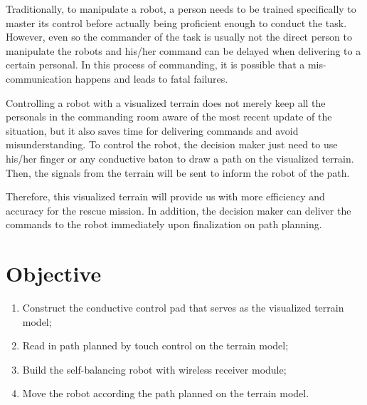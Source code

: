 \documentclass[a4paper,12pt]{article}
\begin{document}
Traditionally, to manipulate a robot, a person needs to be trained specifically to master its control before actually being proficient enough to conduct the task. However, even so the commander of the task is usually not the direct person to manipulate the robots and his/her command can be delayed when delivering to a certain personal. In this process of commanding, it is possible that a mis-communication happens and leads to fatal failures.

Controlling a robot with a visualized terrain does not merely keep all the personals in the commanding room aware of the most recent update of the situation, but it also saves time for delivering commands and avoid misunderstanding. To control the robot, the decision maker just need to use his/her finger or any conductive baton to draw a path on the visualized terrain. Then, the signals from the terrain will be sent to inform the robot of the path. 

Therefore, this visualized terrain will provide us with more efficiency and accuracy for the rescue mission. In addition, the decision maker can deliver the commands to the robot immediately upon finalization on path planning.

\section{Objective}

\begin{enumerate}
	\item Construct the conductive control pad that serves as the visualized terrain model;
	\item Read in path planned by touch control on the terrain model; 
	\item Build the self-balancing robot with wireless receiver module;
	\item Move the robot according the path planned on the terrain model.
\end{enumerate}
\end{document}

